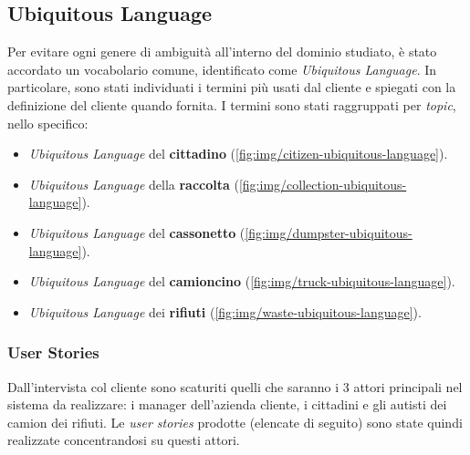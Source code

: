 

\subsection{Ubiquitous Language}
Per evitare ogni genere di ambiguità all'interno del dominio studiato, è stato accordato un vocabolario comune, identificato come \textit{Ubiquitous Language}. In particolare, sono stati individuati i termini più usati dal cliente e spiegati con la definizione del cliente quando fornita. I termini sono stati raggruppati per \textit{topic}, nello specifico:
\begin{itemize}
    \item \textit{Ubiquitous Language} del \textbf{cittadino} (\ref{fig:img/citizen-ubiquitous-language}).
    \item \textit{Ubiquitous Language} della \textbf{raccolta} (\ref{fig:img/collection-ubiquitous-language}).
    \item \textit{Ubiquitous Language} del \textbf{cassonetto} (\ref{fig:img/dumpster-ubiquitous-language}).
    \item \textit{Ubiquitous Language} del \textbf{camioncino} (\ref{fig:img/truck-ubiquitous-language}).
    \item \textit{Ubiquitous Language} dei \textbf{rifiuti} (\ref{fig:img/waste-ubiquitous-language}).
\end{itemize}

\subsubsection{User Stories}
Dall'intervista col cliente sono scaturiti quelli che saranno i 3 attori principali nel sistema da realizzare: i manager dell'azienda cliente, i cittadini e gli autisti dei camion dei rifiuti. Le \textit{user stories} prodotte (elencate di seguito) sono state quindi realizzate concentrandosi su questi attori.

